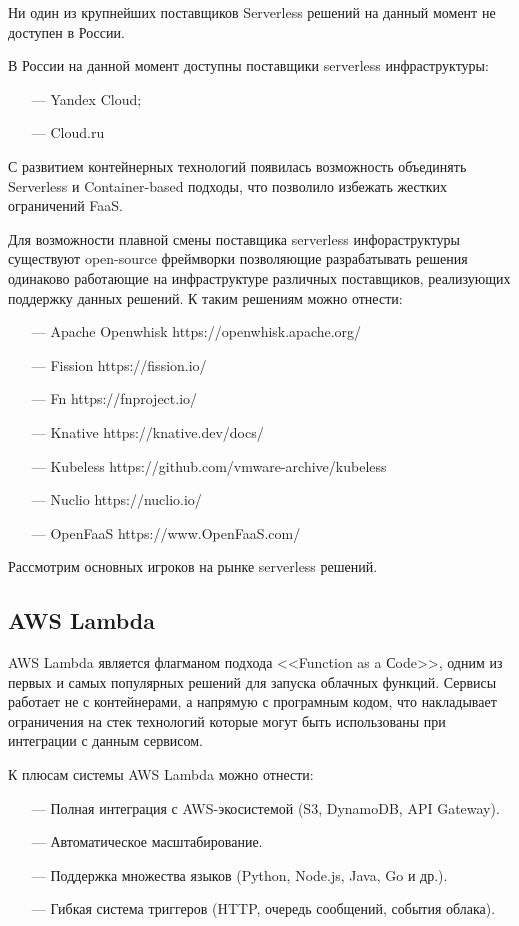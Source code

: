 Ни один из крупнейших поставщиков Serverless решений на данный момент не доступен в России.

В России на данной момент доступны поставщики serverless инфраструктуры:
\begin{itemize}
    \item[---] Yandex Cloud;
    \item[---] Cloud.ru
\end{itemize}

С развитием контейнерных технологий появилась возможность объединять Serverless и Container-based подходы, что позволило избежать жестких ограничений FaaS.

Для возможности плавной смены поставщика serverless инфораструктуры существуют open-source фреймворки позволяющие разрабатывать решения одинаково работающие на инфраструктуре различных поставщиков, реализующих поддержку данных решений. К таким решениям можно отнести:
\begin{itemize}
    \item[---]Apache Openwhisk https://openwhisk.apache.org/
    \item[---]Fission https://fission.io/
    \item[---]Fn https://fnproject.io/
    \item[---]Knative https://knative.dev/docs/
    \item[---]Kubeless https://github.com/vmware-archive/kubeless
    \item[---]Nuclio https://nuclio.io/
    \item[---]OpenFaaS https://www.OpenFaaS.com/
\end{itemize}

Рассмотрим основных игроков на рынке serverless решений.

\subsection{AWS Lambda}

AWS Lambda является флагманом подхода <<Function as a Сode>>, одним из первых и самых популярных решений для запуска облачных функций. Сервисы работает не с контейнерами, а напрямую с програмным кодом, что накладывает ограничения на стек технологий которые могут быть использованы при интеграции с данным сервисом.

К плюсам системы AWS Lambda можно отнести:
\begin{itemize}
    \item[---]Полная интеграция с AWS-экосистемой (S3, DynamoDB, API Gateway).
    \item[---]Автоматическое масштабирование.
    \item[---]Поддержка множества языков (Python, Node.js, Java, Go и др.).
    \item[---]Гибкая система триггеров (HTTP, очередь сообщений, события облака).
\end{itemize}

